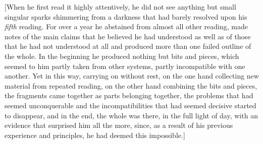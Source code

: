 [When he first read it highly attentively, he did not see anything but small singular sparks shimmering from a darkness that had barely resolved upon his \textit{fifth} reading. For over a year he abstained from almost all other reading, made notes of the main claims that he believed he had understood as well as of those that he had not understood at all and produced more than one failed outline of the whole. In the beginning he produced nothing but bits and pieces, which seemed to him partly taken from other systems, partly incompatible with one another. Yet in this way, carrying on without rest, on the one hand collecting new material from repeated reading, on the other hand combining the bits and pieces, the fragments came together as parts belonging together, the problems that had seemed unconquerable and the incompatibilities that had seemed decisive started to disappear, and in the end, the whole was there, in the full light of day, with an evidence that surprised him all the more, since, as a result of his previous experience and principles, he had deemed this impossible.]

